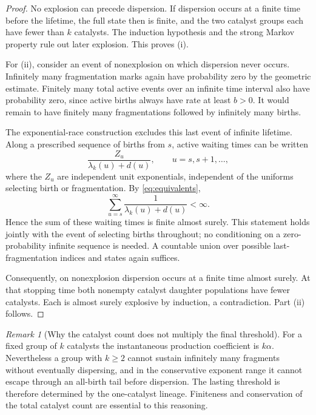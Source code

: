 \documentclass[11pt,a4paper]{article}
\theoremstyle{remark}\newtheorem{remark}[theorem]{Remark}
\begin{document}
\begin{proof}
No explosion can precede dispersion. If dispersion occurs at a finite time before the lifetime, the full state then is finite, and the two catalyst groups each have fewer than $k$ catalysts. The induction hypothesis and the strong Markov property rule out later explosion. This proves (i).

For (ii), consider an event of nonexplosion on which dispersion never occurs. Infinitely many fragmentation marks again have probability zero by the geometric estimate. Finitely many total active events over an infinite time interval also have probability zero, since active births always have rate at least $b>0$. It would remain to have finitely many fragmentations followed by infinitely many births.

The exponential-race construction excludes this last event of infinite lifetime. Along a prescribed sequence of births from $s$, active waiting times can be written
\[
\frac{Z_u}{\lambda_k(u)+d(u)},\qquad u=s,s+1,\ldots,
\]
where the $Z_u$ are independent unit exponentials, independent of the uniforms selecting birth or fragmentation. By \eqref{eq:equivalents},
\begin{equation}\label{eq:holding-sum}
\sum_{u=s}^{\infty}\frac1{\lambda_k(u)+d(u)}<\infty.
\end{equation}
Hence the sum of these waiting times is finite almost surely. This statement holds jointly with the event of selecting births throughout; no conditioning on a zero-probability infinite sequence is needed. A countable union over possible last-fragmentation indices and states again suffices.

Consequently, on nonexplosion dispersion occurs at a finite time almost surely. At that stopping time both nonempty catalyst daughter populations have fewer catalysts. Each is almost surely explosive by induction, a contradiction. Part (ii) follows.
\end{proof}

\begin{remark}[Why the catalyst count does not multiply the final threshold]
For a fixed group of $k$ catalysts the instantaneous production coefficient is $k\alpha$. Nevertheless a group with $k\ge2$ cannot sustain infinitely many fragments without eventually dispersing, and in the conservative exponent range it cannot escape through an all-birth tail before dispersion. The lasting threshold is therefore determined by the one-catalyst lineage. Finiteness and conservation of the total catalyst count are essential to this reasoning.
\end{remark}
\end{document}
